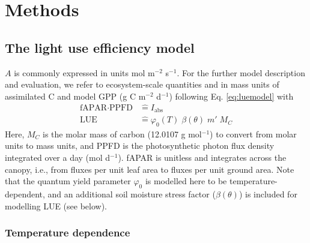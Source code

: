 \documentclass{myreport}
\begin{document}
\section{Methods}
\label{sec:methods}

\subsection{The light use efficiency model}
\label{sec:luemodel}
$A$ is commonly expressed in units mol m$^{-2}$ s$^{-1}$. For the further model description and evaluation, we refer to ecosystem-scale quantities and in mass units of assimilated C and model GPP (g C m$^{-2}$ d$^{-1}$) following Eq. \ref{eq:luemodel}
with 
\begin{align}
    \text{fAPAR} \cdot \text{PPFD} &\mathrel{\widehat{=}} I_{\text{abs}} \\
    \label{eq:lue_identification}
    \text{LUE} &\mathrel{\widehat{=}} \varphi_0(T) \; \beta(\theta) \; m' \; M_C
\end{align}
Here, $M_C$ is the molar mass of carbon (12.0107 g mol$^{-1}$) to convert from molar units to mass units, and PPFD is the photosynthetic photon flux density integrated over a day (mol d$^{-1}$). fAPAR is unitless and integrates across the canopy, i.e., from fluxes per unit leaf area to fluxes per unit ground area. Note that the quantum yield parameter $\varphi_0$ is modelled here to be temperature-dependent, and an additional soil moisture stress factor ($\beta (\theta)$) is included for modelling LUE (see below).

\subsubsection{Temperature dependence}
\end{document}
